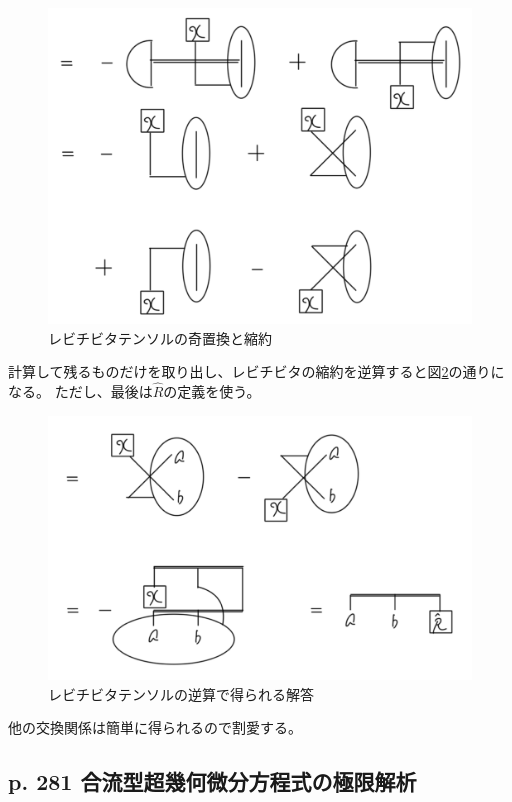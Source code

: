 \documentclass{jsarticle}
\begin{document}
\begin{figure}
    \centering
    \includegraphics{Rhat-odd-replace.png}
    \caption{レビチビタテンソルの奇置換と縮約}
    \label{fig:Rhat odd replace}
\end{figure}

計算して残るものだけを取り出し、レビチビタの縮約を逆算すると図\ref*{fig:Rhat solution}の通りになる。
ただし、最後は$\hat{R}$の定義を使う。

\begin{figure}
    \centering
    \includegraphics{Rhat-solution.png}
    \caption[]{レビチビタテンソルの逆算で得られる解答}
    \label{fig:Rhat solution}
\end{figure}

他の交換関係は簡単に得られるので割愛する。


\subsection*{p. 281 合流型超幾何微分方程式の極限解析}
\end{document}
